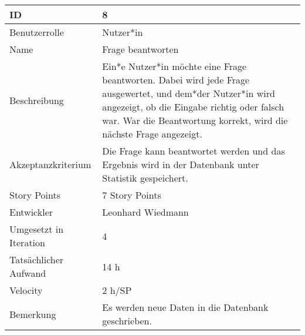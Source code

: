 \begin{tabularx}{\textwidth}{|p{}|X|}
	\hline
	ID & 8\\
	\hline
	Benutzerrolle & Nutzer*in\\
	\hline
	Name & Frage beantworten\\
	\hline
	Beschreibung & Ein*e Nutzer*in möchte eine Frage beantworten. Dabei wird jede Frage ausgewertet, und dem*der Nutzer*in wird angezeigt, ob die Eingabe richtig oder falsch war. War die Beantwortung korrekt, wird die nächste Frage angezeigt.\\
	\hline
	Akzeptanzkriterium & Die Frage kann beantwortet werden und das Ergebnis wird in der Datenbank unter Statistik gespeichert.\\
	\hline
	Story Points & 7 Story Points\\
	\hline
	Entwickler & Leonhard Wiedmann\\
	\hline
	Umgesetzt in Iteration & 4\\
	\hline
	Tatsächlicher Aufwand & 14 h\\
	\hline
	Velocity & 2 h/SP\\
	\hline
	Bemerkung & Es werden neue Daten in die Datenbank geschrieben.\\
	\hline
\end{tabularx}
\vspace{20pt}
